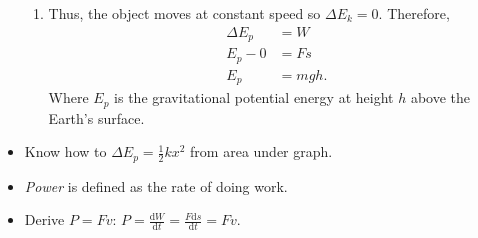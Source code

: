 \documentclass[oneside]{book}
\begin{document}
\begin{itemize}
\begin{enumerate}
        \item Thus, the object moves at constant speed so \(\Delta E_k=0\). Therefore, 
        \begin{align*}
            \Delta E_p&= W\\
            E_p-0&=Fs\\
            E_p&=mgh.
        \end{align*}
        Where \(E_p\) is the gravitational potential energy at height \(h\) above the Earth's surface.
    \end{enumerate}
    \item Know how to \(\Delta E_p=\frac{1}{2}kx^2\) from area under graph.
    \item \textit{Power} is defined as the rate of doing work.
    \item Derive \(P=Fv\): \(P=\frac{\text{d}W}{\text{d}t}=\frac{F\text{d}s}{\text{d}t}=Fv\).
\end{itemize}
\end{document}
